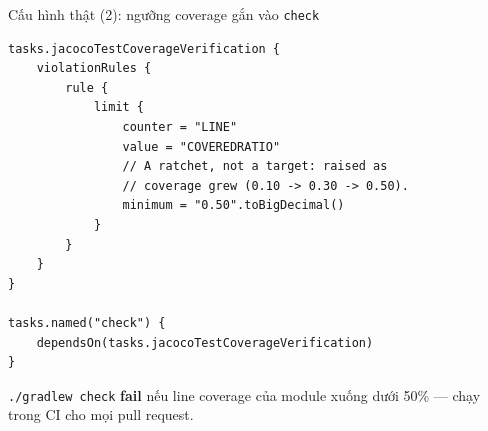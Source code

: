 \documentclass[aspectratio=169,12pt]{beamer}
\begin{document}
\begin{frame}[fragile]{Cấu hình thật (2): ngưỡng coverage gắn vào \texttt{check}}
\begin{lstlisting}[basicstyle=\ttfamily\scriptsize]
tasks.jacocoTestCoverageVerification {
    violationRules {
        rule {
            limit {
                counter = "LINE"
                value = "COVEREDRATIO"
                // A ratchet, not a target: raised as
                // coverage grew (0.10 -> 0.30 -> 0.50).
                minimum = "0.50".toBigDecimal()
            }
        }
    }
}

tasks.named("check") {
    dependsOn(tasks.jacocoTestCoverageVerification)
}
\end{lstlisting}

  {\small \texttt{./gradlew check} \textbf{fail} nếu line coverage của module
  xuống dưới 50\% --- chạy trong CI cho mọi pull request.}
\end{frame}
\end{document}
